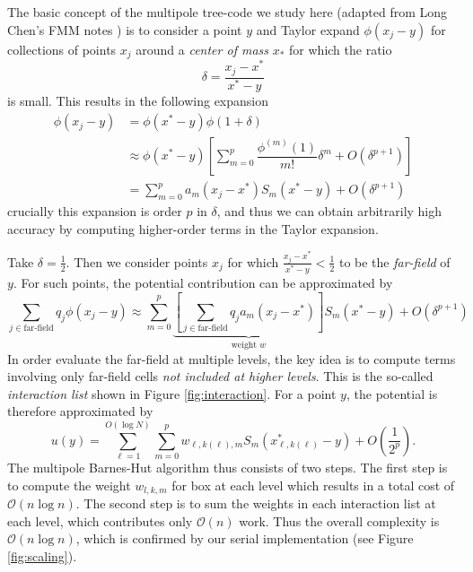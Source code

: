 \documentclass{article}
\newcommand{\pr}[1]{\left(#1\right)}
\newcommand{\br}[1]{\left[#1\right]}
\renewcommand{\O}{\mathcal{O}}
\begin{document}
The basic concept of the multipole tree-code we study here (adapted from Long Chen's FMM notes \cite{chenintroduction}) is to consider a point $y$ and Taylor expand $\phi(x_j - y)$ for collections of points $x_j$ around a \textit{center of mass} $x_*$ for which the ratio
\begin{equation}
  \delta = \frac{x_j-x^*}{x^*-y}
\end{equation} 
is small. This results in the following expansion
\begin{align}
  \phi(x_j-y) 
  &= \phi(x^*-y)\phi(1+\delta)\\
  & \approx \phi(x^*-y)\br{\sum_{m=0}^p \dfrac{\phi^{(m)}(1)}{m!}\delta^m + O(\delta^{p+1})}\\
  & = \sum_{m=0}^p a_m(x_j-x^*)S_m(x^*-y) + O(\delta^{p+1})
\end{align}
crucially this expansion is order $p$ in $\delta$, and thus we can obtain arbitrarily high accuracy by computing higher-order terms in the Taylor expansion.

Take $\delta = \frac{1}{2}$. Then we consider points $x_j$ for which $\frac{x_j-x^*}{x^*-y} < \frac{1}{2}$ to be the \textit{far-field} of $y$. For such points, the potential contribution can be approximated by
\begin{equation}
  \sum_{j\in\text{far-field}} q_j\phi(x_j-y) \approx \sum_{m=0}^p \underbrace{\br{\sum_{j\in\text{far-field}} q_j a_m(x_j-x^*)}}_{\text{weight }w} S_m(x^*-y)+ O(\delta^{p+1})
\end{equation}
In order evaluate the far-field at multiple levels, the key idea is to compute terms involving only far-field cells \emph{not included at higher levels}. This is the so-called \textit{interaction list} shown in Figure \ref{fig:interaction}. For a point $y$, the potential is therefore approximated by
\begin{equation}
  u(y) = \sum_{\ell=1}^{O(\log N)}\sum_{m=0}^p w_{\ell,k(\ell),m} S_m\pr{x_{\ell, k(\ell)}^* - y} + O\pr{\frac{1}{2^p}}.
\end{equation}
The multipole Barnes-Hut algorithm thus consists of two steps. The first step is to compute the weight $w_{l, k, m}$ for box at each level which results in a total cost of $\O(n\log n)$. The second step is to sum the weights in each interaction list at each level, which contributes only $\O(n)$ work. Thus the overall complexity is $\O(n\log n)$, which is confirmed by our serial implementation (see Figure \ref{fig:scaling}).
\end{document}
